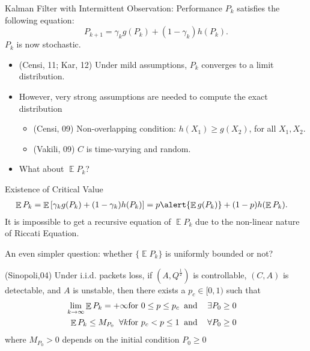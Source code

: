 \documentclass{beamer}
\DeclareMathOperator{\E}{\mathbb E}
\begin{document}
  \begin{frame}{Kalman Filter with Intermittent Observation: Performance}
    $P_k$ satisfies the following equation:
    \begin{equation}
      P_{k+1}= \gamma_k g(P_k) + (1-\gamma_k) h(P_k).
      \label{eq:basicricattieqn}
    \end{equation}
    $P_k$ is now stochastic. 
    \begin{itemize}
      \item (Censi, 11; Kar, 12) Under mild assumptions, $P_k$ converges to a limit distribution.
      \item However, very strong assumptions are needed to compute the exact distribution 
	\begin{itemize}
	  \item (Censi, 09) Non-overlapping condition: $h(X_1)\geq g(X_2)$, for all $X_1,X_2$.
	  \item (Vakili, 09) $C$ is time-varying and random.
	\end{itemize}
      \item What about $\E P_k$?
    \end{itemize}
  \end{frame}

  \begin{frame}{Existence of Critical Value}
    \begin{displaymath}
      \begin{split}
	\E P_k &= \E\left[\gamma_k g(P_k) + (1-\gamma_k) h(P_k)\right]= p\alert{\E g(P_k)} + (1-p) h(\E P_k).
      \end{split}
    \end{displaymath}
    It is impossible to get a recursive equation of $\E P_k$ due to the non-linear nature of Riccati Equation. 

    An even simpler question: whether $\{\E P_k\}$ is uniformly bounded or not?
    \begin{theorem}
      (Sinopoli,04) Under i.i.d. packets loss, if $(A,Q^{\frac{1}{2}})$ is controllable, $(C,A)$ is detectable, and $A$ is unstable, then there exists a $p_c\in[0,1)$ such that
      \begin{eqnarray}\label{eqn:lambdaCrit}
	\lim_{k\rightarrow\infty}\E P_k=+\infty & \mbox{for } 0\leq
	p \leq p_c \; \;
	\mbox{and  \hspace{3mm}$\exists P_0 \geq 0$}&\\
	\E P_k \leq M_{P_0} \;\; \forall k & \mbox{for } p_c <
	p \leq 1 \; \; \mbox{and \hspace{3mm}$\forall P_0 \geq 0$}&
      \end{eqnarray}
      where $M_{P_0} > 0 $  depends on the initial condition $P_0 \geq 0$
    \end{theorem}
  \end{frame}
\end{document}
